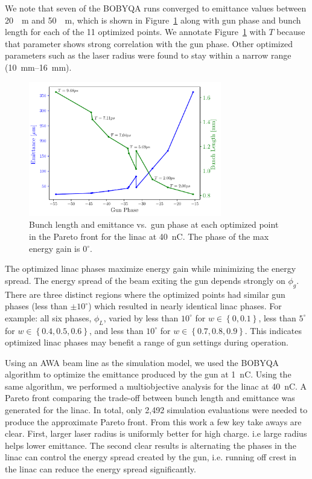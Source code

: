 We note that seven of the BOBYQA runs converged to emittance values
between \SI{20}{\mu m} and \SI{50}{\mu m}, which is shown in Figure~\ref{fig:trade} 
along with gun phase and bunch length for each of the 11
optimized points. We annotate Figure~\ref{fig:trade} with $T$ because that parameter 
shows strong correlation with the gun phase. Other optimized parameters such as the laser radius were found to stay within a 
narrow range (\SIrange{10}{16}{mm}).  
\begin{figure}%
	\begin{center}
		\includegraphics[width=0.75\textwidth]{images/THPAB155f3}
		\caption{\label{fig:trade}Bunch length and emittance vs.~gun phase at each optimized point in the Pareto front for the linac at \SI{40}{nC}. The phase of the max energy gain is 0$^{\circ}$.}
	\end{center}
\end{figure}


The optimized linac phases maximize energy gain while minimizing the energy spread.
The energy spread of the beam exiting the gun depends strongly on $\phi_g$.
There are three distinct regions where the optimized points had similar gun phases 
(less than $\pm10^{\circ}$) which resulted in nearly identical linac phases. For example:  
all six phases, $\phi_L$, varied by less than $10^{\circ}$ for $w \in \left\{ 0, 0.1\right\}$,
less than $5^{\circ}$ for $w \in \left\{ 0.4, 0.5, 0.6\right\}$, 
and less than $10^{\circ}$ for $w \in \left\{ 0.7, 0.8, 0.9\right\}$.
This indicates optimized linac phases may benefit a range of gun settings during operation. 


Using an AWA beam line as the simulation model, we used the BOBYQA algorithm 
to optimize the emittance produced by the gun at \SI{1}{nC}.
Using the same algorithm, we performed a multiobjective analysis for the linac at \SI{40}{nC}. 
A Pareto front comparing the trade-off between bunch length and emittance was generated for the linac. 
In total, only 2,492 simulation evaluations were needed to produce the approximate Pareto front.
From this work a few key take aways are clear. First, larger laser radius
is uniformly better for high charge. i.e large radius helps lower emittance.
The second clear results is alternating the phases in the linac can control 
the energy spread created by the gun, i.e. running off crest in the linac 
can reduce the energy spread significantly.

